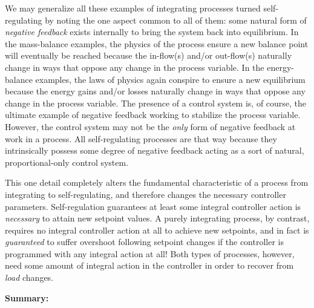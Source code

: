 We may generalize all these examples of integrating processes turned self-regulating by noting the one aspect common to all of them: some natural form of \textit{negative feedback} exists internally to bring the system back into equilibrium.  In the mass-balance examples, the physics of the process ensure a new balance point will eventually be reached because the in-flow(s) and/or out-flow(s) naturally change in ways that oppose any change in the process variable.  In the energy-balance examples, the laws of physics again conspire to ensure a new equilibrium because the energy gains and/or losses naturally change in ways that oppose any change in the process variable.  The presence of a control system is, of course, the ultimate example of negative feedback working to stabilize the process variable.  However, the control system may not be the \textit{only} form of negative feedback at work in a process.  All self-regulating processes are that way because they intrinsically possess some degree of negative feedback acting as a sort of natural, proportional-only control system.  

\filbreak

This one detail completely alters the fundamental characteristic of a process from integrating to self-regulating, and therefore changes the necessary controller parameters.  Self-regulation guarantees at least some integral controller action is \textit{necessary} to attain new setpoint values.  A purely integrating process, by contrast, requires no integral controller action at all to achieve new setpoints, and in fact is \textit{guaranteed} to suffer overshoot following setpoint changes if the controller is programmed with any integral action at all!  Both types of processes, however, need some amount of integral action in the controller in order to recover from \textit{load} changes.

\vskip 10pt

\noindent
\textbf{Summary:}

